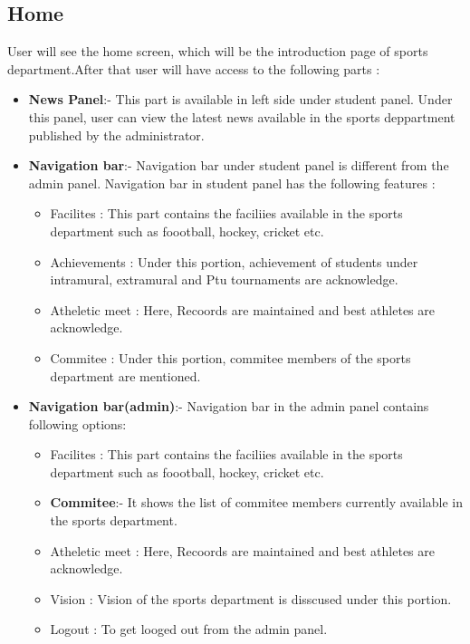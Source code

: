 	
	\subsection{Home}
	 User will see the home screen, which will be the introduction page of sports department.After that user will have access to the following parts : 
	\begin{itemize}
		\item \textbf{News Panel}:- This part is available in left side under student panel. Under this panel, user can view the latest news available in the sports deppartment published by the administrator.
		
		\item \textbf{Navigation bar}:- Navigation bar under student panel is different from the admin panel. Navigation bar in student panel has the following features : 
		\begin{itemize}
		\item Facilites : This part contains the faciliies available in the sports department such as foootball, hockey, cricket etc.
		\item Achievements : Under this portion, achievement of students under intramural, extramural and Ptu tournaments are acknowledge.
		\item Atheletic meet : Here, Recoords are maintained and best athletes are acknowledge.
		\item Commitee : Under this portion, commitee members of the sports department are mentioned.
\end{itemize}		   
				
		\item \textbf{Navigation bar(admin)}:- Navigation bar in the admin panel contains following options:
		\begin{itemize}
			\item Facilites : This part contains the faciliies available in the sports department such as foootball, hockey, cricket etc.
			
			\item \textbf{Commitee}:- It shows the list of commitee members currently available in the sports department.
			
		
		\item Atheletic meet : Here, Recoords are maintained and best athletes are acknowledge.
		\item Vision : Vision of the sports department is disscused under this portion. 
		\item Logout : To get looged out from the admin panel.
			

\end{itemize}
\end{itemize}
